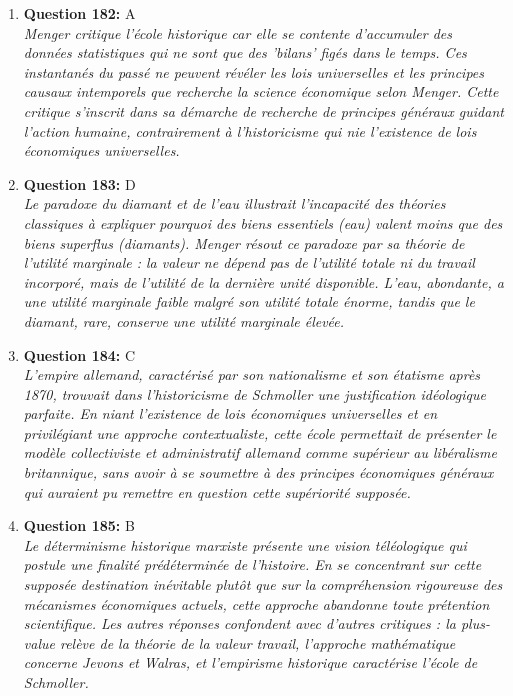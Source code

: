 \documentclass[12pt,a4paper]{article}
\begin{document}
\begin{enumerate}
\item \textbf{Question 182:} A
\\ \textit{Menger critique l'école historique car elle se contente d'accumuler des données statistiques qui ne sont que des 'bilans' figés dans le temps. Ces instantanés du passé ne peuvent révéler les lois universelles et les principes causaux intemporels que recherche la science économique selon Menger. Cette critique s'inscrit dans sa démarche de recherche de principes généraux guidant l'action humaine, contrairement à l'historicisme qui nie l'existence de lois économiques universelles.}

\item \textbf{Question 183:} D
\\ \textit{Le paradoxe du diamant et de l'eau illustrait l'incapacité des théories classiques à expliquer pourquoi des biens essentiels (eau) valent moins que des biens superflus (diamants). Menger résout ce paradoxe par sa théorie de l'utilité marginale : la valeur ne dépend pas de l'utilité totale ni du travail incorporé, mais de l'utilité de la dernière unité disponible. L'eau, abondante, a une utilité marginale faible malgré son utilité totale énorme, tandis que le diamant, rare, conserve une utilité marginale élevée.}

\item \textbf{Question 184:} C
\\ \textit{L'empire allemand, caractérisé par son nationalisme et son étatisme après 1870, trouvait dans l'historicisme de Schmoller une justification idéologique parfaite. En niant l'existence de lois économiques universelles et en privilégiant une approche contextualiste, cette école permettait de présenter le modèle collectiviste et administratif allemand comme supérieur au libéralisme britannique, sans avoir à se soumettre à des principes économiques généraux qui auraient pu remettre en question cette supériorité supposée.}

\item \textbf{Question 185:} B
\\ \textit{Le déterminisme historique marxiste présente une vision téléologique qui postule une finalité prédéterminée de l'histoire. En se concentrant sur cette supposée destination inévitable plutôt que sur la compréhension rigoureuse des mécanismes économiques actuels, cette approche abandonne toute prétention scientifique. Les autres réponses confondent avec d'autres critiques : la plus-value relève de la théorie de la valeur travail, l'approche mathématique concerne Jevons et Walras, et l'empirisme historique caractérise l'école de Schmoller.}


\end{enumerate}
\end{document}
